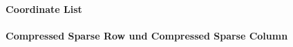 \documentclass[crop=false]{standalone}
\begin{document}

        \paragraph{Coordinate List} %
        \label{par:coordinate_list}


        \paragraph{Compressed Sparse Row und Compressed Sparse Column} %
        \label{par:compressed_sparse_row_und_compressed_sparse_column}

\end{document}
